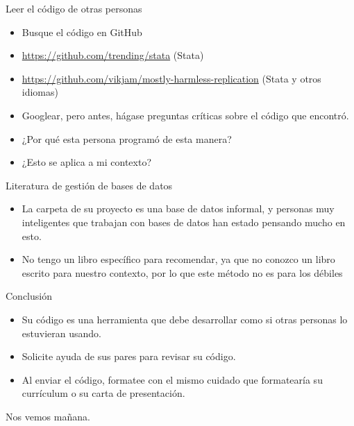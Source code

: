 \documentclass[11pt, aspectratio=169, compress]{beamer}
\makeatletter
\def\beamer@writeslidentry@miniframesoff{%
	\expandafter\beamer@ifempty\expandafter{\beamer@framestartpage}{}%
	{%
		\clearpage\beamer@notesactions%
	}
}
\newcommand*{\miniframesoff}{\let\beamer@writeslidentry=\beamer@writeslidentry@miniframesoff}
\makeatother
\begin{document}
\begin{frame}{Leer el código de otras personas}
	\begin{itemize}
		\item Busque el código en GitHub
		\item \href{https://github.com/trending/stata}{https://github.com/trending/stata} (Stata)
		\item \href{https://github.com/vikjam/mostly-harmless-replication}{https://github.com/vikjam/mostly-harmless-replication} (Stata y otros idiomas)
		\item Googlear, pero antes, hágase preguntas críticas sobre el código que encontró.
		\item ¿Por qué esta persona programó de esta manera?
		\item ¿Esto se aplica a mi contexto?
	\end{itemize}	
\end{frame}
\begin{frame}{Literatura de gestión de bases de datos}
	\begin{itemize}
		\item La carpeta de su proyecto es una base de datos informal, y personas muy inteligentes que trabajan con bases de datos han estado pensando mucho en esto.
		\item No tengo un libro específico para recomendar, ya que no conozco un libro escrito para nuestro contexto, por lo que este método no es para los débiles
	\end{itemize}		
\end{frame}
\begin{frame}{Conclusión}
	\begin{itemize}
		\item Su código es una herramienta que debe desarrollar como si otras personas lo estuvieran usando.

		\item Solicite ayuda de sus pares para revisar su código.
		
		\item Al enviar el código, formatee con el mismo cuidado que formatearía su currículum o su carta de presentación.
	\end{itemize}
\end{frame}
\miniframesoff 	
\begin{frame}
Nos vemos mañana.
\end{frame}
\end{document}
